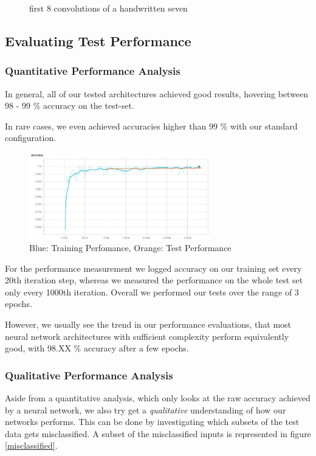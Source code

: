 \documentclass{article}
\begin{document}
\begin{figure}
\begin{tabular}{cc}
\end{tabular}
\caption{first 8 convolutions of a handwritten seven}\label{convout}
\end{figure}

\subsection{Evaluating Test Performance}
\subsubsection{Quantitative Performance Analysis}

In general, all of our tested architectures achieved good results, hovering between 98 - 99 \% accuracy on the test-set.

In rare cases, we even achieved accuracies higher than 99 \% with our standard configuration.

\begin{figure}[h]
\centering
\includegraphics[width=0.7\textwidth]{imgs/accuracy_std.png}
\caption{Blue: Training Perfomance, Orange: Test Performance}
\end{figure}

For the performance measurement we logged accuracy on our training set every 20th iteration step, whereas we measured the performance on the whole test set only every 1000th iteration. Overall we performed our tests over the range of 3 epochs. 

However, we usually see the trend in our performance evaluations, that most neural network architectures with sufficient complexity perform equivalently good, with 98.XX \% accuracy after a few epochs.

\subsubsection{Qualitative Performance Analysis}

Aside from a quantitative analysis, which only looks at the raw accuracy achieved by a neural network, we also try get a \textit{qualitative} understanding of how our networks performs. This can be done by investigating which subsets of the test data gets misclassified. A subset of the misclassified inputs is represented in figure \ref{misclassified}.
\end{document}
